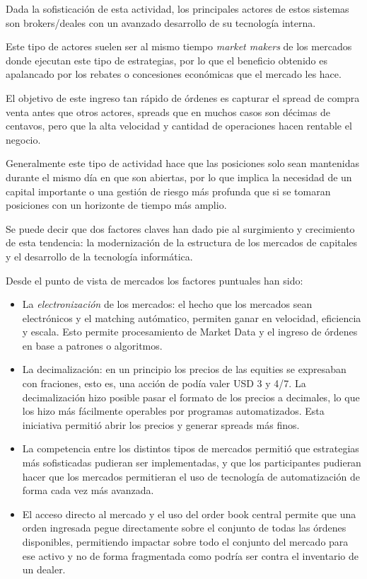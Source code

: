 Dada la sofisticación de esta actividad, los principales actores de estos
sistemas son brokers/deales con un avanzado desarrollo de su tecnología
interna.

Este tipo de actores suelen ser al mismo tiempo \emph{market makers} de los
mercados donde ejecutan este tipo de estrategias, por lo que el beneficio
obtenido es apalancado por los rebates o concesiones económicas que el mercado
les hace.

El objetivo de este ingreso tan rápido de órdenes es capturar el spread de
compra venta antes que otros actores, spreads que en muchos casos son décimas
de centavos, pero que la alta velocidad y cantidad de operaciones hacen
rentable el negocio.

Generalmente este tipo de actividad hace que las posiciones solo sean
mantenidas durante el mismo día en que son abiertas, por lo que implica la
necesidad de un capital importante o una gestión de riesgo más profunda que si
se tomaran posiciones con un horizonte de tiempo más amplio.

Se puede decir que dos factores claves han dado pie al surgimiento y 
crecimiento de esta tendencia: la modernización de la estructura de los 
mercados de capitales y el desarrollo de la tecnología informática. 

Desde el punto de vista de mercados los factores puntuales han sido:
\begin{itemize}
 \item La \emph{electronización} de los mercados: el hecho que los mercados
sean electrónicos y el matching autómatico, permiten ganar en velocidad,
eficiencia y escala. Esto permite procesamiento de Market Data y el ingreso de
órdenes en base a patrones o algoritmos. 
 \item La decimalización: en un principio los precios de las equities se
expresaban con fraciones, esto es, una acción de podía valer USD 3 y 4/7. La
decimalización hizo posible pasar el formato de los precios a decimales, lo que
los hizo más fácilmente operables por programas automatizados. Esta iniciativa
permitió abrir los precios y generar spreads más finos.
 \item La competencia entre los distintos tipos de mercados permitió que
estrategias más sofisticadas pudieran ser implementadas, y que los
participantes pudieran hacer que los mercados permitieran el uso de tecnología
de automatización de forma cada vez más avanzada.
 \item El acceso directo al mercado y el uso del order book central permite que
una orden ingresada pegue directamente sobre el conjunto de todas las órdenes
disponibles, permitiendo impactar sobre todo el conjunto del mercado para ese
activo y no de forma fragmentada como podría ser contra el inventario de un
dealer.
\end{itemize}

